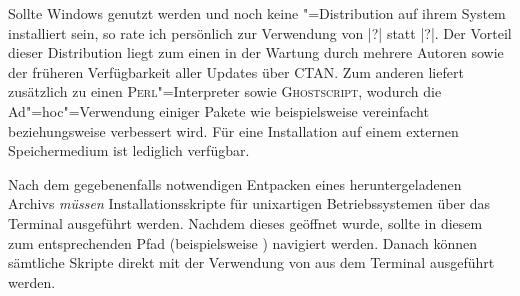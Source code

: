 
Sollte Windows genutzt werden und noch keine "=Distribution auf 
ihrem System installiert sein, so rate ich persönlich zur Verwendung von 
|?| statt |?|. 
Der Vorteil dieser Distribution liegt zum einen in der Wartung durch mehrere 
Autoren sowie der früheren Verfügbarkeit aller Updates über CTAN. Zum anderen 
liefert  zusätzlich zu  einen 
\textsc{Perl}"=Interpreter sowie \textsc{Ghostscript}, wodurch die 
Ad"=hoc"=Verwendung einiger Pakete wie beispielsweise  
vereinfacht beziehungsweise verbessert wird. Für eine Installation auf einem 
externen Speichermedium ist lediglich  
verfügbar.

Nach dem gegebenenfalls notwendigen Entpacken eines heruntergeladenen Archivs
\emph{müssen} Installationsskripte für unixartigen Betriebssystemen über das 
Terminal ausgeführt werden. Nachdem dieses geöffnet wurde, sollte in diesem zum 
entsprechenden Pfad (beispielsweise ) 
navigiert werden. Danach können sämtliche Skripte direkt mit der Verwendung von
 aus dem Terminal ausgeführt werden.


